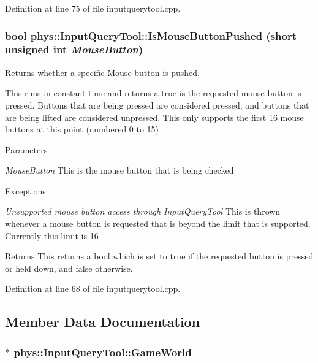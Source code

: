 Definition at line 75 of file inputquerytool.cpp.

\hypertarget{classphys_1_1InputQueryTool_aab9a7be4d95289d828378f7f3d5fc065}{
\subsubsection[{IsMouseButtonPushed}]{\setlength{\rightskip}{0pt plus 5cm}bool phys::InputQueryTool::IsMouseButtonPushed (short unsigned int {\em MouseButton})}}
\label{da/d96/classphys_1_1InputQueryTool_aab9a7be4d95289d828378f7f3d5fc065}


Returns whether a specific Mouse button is pushed. 

This runs in constant time and returns a true is the requested mouse button is pressed. Buttons that are being pressed are considered pressed, and buttons that are being lifted are considered unpressed. This only supports the first 16 mouse buttons at this point (numbered 0 to 15) 
\begin{DoxyParams}{Parameters}
\item[{\em MouseButton}]This is the mouse button that is being checked \end{DoxyParams}

\begin{DoxyExceptions}{Exceptions}
\item[{\em Unsupported mouse button access through InputQueryTool}]This is thrown whenever a mouse button is requested that is beyond the limit that is supported. Currently this limit is 16 \end{DoxyExceptions}
\begin{DoxyReturn}{Returns}
This returns a bool which is set to true if the requested button is pressed or held down, and false otherwise. 
\end{DoxyReturn}


Definition at line 68 of file inputquerytool.cpp.



\subsection{Member Data Documentation}
\hypertarget{classphys_1_1InputQueryTool_ab24a64fc316eefb7e88c1ed75ecee7ea}{
\subsubsection[{GameWorld}]{$\ast$ {\bf phys::InputQueryTool::GameWorld}}}
\label{da/d96/classphys_1_1InputQueryTool_ab24a64fc316eefb7e88c1ed75ecee7ea}


